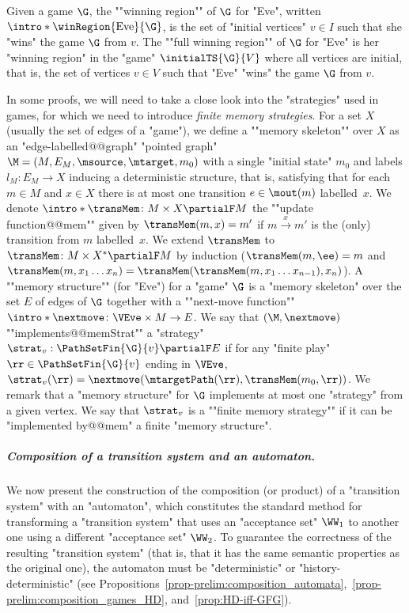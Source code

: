 \documentclass[10pt,a4paper]{amsart}
\newcommand{\re}[1]{\xrightarrow{#1}}
\newcommand{\Eve}{\mathrm{Eve}}
\begin{document}
\AP Given a game $\G$, the ""winning region"" of $\G$ for "Eve", written $\intro*\winRegion{\Eve}{\G}$, is the set of "initial vertices" $v\in I$ such that she "wins" the game $\G$ from $v$. %
\AP The ""full winning region"" of $\G$ for "Eve" is her "winning region" in the "game" $\initialTS{\G}{V}$ where all vertices are initial, that is, the set of vertices $v\in V$ such that "Eve" "wins" the game $\G$ from $v$. 

In some proofs, we will need to take a close look into the "strategies" used in games, for which we need to introduce \emph{finite memory strategies}.
\AP For a set $X$ (usually the set of edges of a "game"), we define a ""memory skeleton"" over $X$ as an "edge-labelled@@graph" "pointed graph" $\M = (M, E_M, \msource, \mtarget, m_0)$ with a single "initial state" $m_0$ and labels $l_M\colon E_M\to X$ inducing a deterministic structure, that is, satisfying that for each $m\in M$ and $x\in X$ there is at most one transition $e\in \mout(m)$ labelled~$x$.
\AP We denote $\intro*\transMem\colon M \times X \partialF M$ the ""update function@@mem"" given by $\transMem(m, x) = m'$ if $m\re{x}m'$ is the (only) transition from $m$ labelled~$x$. We extend $\transMem$ to $\transMem\colon M\times X^* \partialF M$ by induction ($\transMem(m,\ee) = m$ and $\transMem(m,x_1\dots x_n) = \transMem(\transMem(m,x_1\dots x_{n-1}),x_n)$).
\AP A ""memory structure"" (for "Eve") for  a "game" $\G$ is a "memory skeleton" over the set $E$ of edges of $\G$ together with a ""next-move function"" $\intro*\nextmove\colon \VEve\times M \to E$.
\AP We say that $(\M, \nextmove)$ ""implements@@memStrat"" a "strategy" $\strat_{v}: \PathSetFin{\G}{v}  \partialF E$  if for any "finite play" $\rr\in \PathSetFin{\G}{v}$ ending in $\VEve$, $\strat_{v}(\rr) = \nextmove(\mtargetPath(\rr), \transMem(m_0, \rr))$. We remark that a  "memory structure" for $\G$ implements at most one "strategy" from a given vertex.
We say that $\strat_{v}$ is a ""finite memory strategy"" if it can be "implemented by@@mem" a finite "memory structure".

\subparagraph*{Composition of a transition system and an automaton.}
We now present the construction of the composition (or product) of a "transition system" with an "automaton", which constitutes the standard method for transforming a "transition system" that uses an "acceptance set" $\WW_1$ to another one using a different "acceptance set" $\WW_2$. To guarantee the correctness of the resulting "transition system" (that is, that it has the same semantic properties as the original one), the automaton must be "deterministic" or "history-deterministic" (see Propositions~\ref{prop-prelim:composition_automata},~\ref{prop-prelim:composition_games_HD}, and~\ref{prop:HD-iff-GFG}). 
\end{document}
